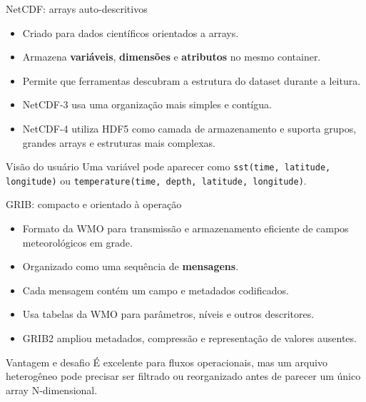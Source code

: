 \documentclass[aspectratio=169]{beamer}
\begin{document}
\begin{frame}{NetCDF: arrays auto-descritivos}
\begin{itemize}
  \item Criado para dados científicos orientados a arrays.
  \item Armazena \textbf{variáveis}, \textbf{dimensões} e \textbf{atributos} no mesmo container.
  \item Permite que ferramentas descubram a estrutura do dataset durante a leitura.
  \item NetCDF-3 usa uma organização mais simples e contígua.
  \item NetCDF-4 utiliza HDF5 como camada de armazenamento e suporta grupos, grandes arrays e estruturas mais complexas.
\end{itemize}

\vspace{0.35cm}

\begin{block}{Visão do usuário}
Uma variável pode aparecer como \texttt{sst(time, latitude, longitude)} ou
\texttt{temperature(time, depth, latitude, longitude)}.
\end{block}
\end{frame}

\begin{frame}{GRIB: compacto e orientado à operação}
\begin{itemize}
  \item Formato da WMO para transmissão e armazenamento eficiente de campos meteorológicos em grade.
  \item Organizado como uma sequência de \textbf{mensagens}.
  \item Cada mensagem contém um campo e metadados codificados.
  \item Usa tabelas da WMO para parâmetros, níveis e outros descritores.
  \item GRIB2 ampliou metadados, compressão e representação de valores ausentes.
\end{itemize}

\vspace{0.35cm}

\begin{block}{Vantagem e desafio}
É excelente para fluxos operacionais, mas um arquivo heterogêneo pode precisar ser filtrado ou reorganizado antes de parecer um único array N-dimensional.
\end{block}
\end{frame}
\end{document}
